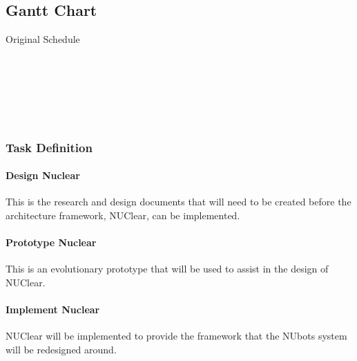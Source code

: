 \documentclass[english,12pt]{scrartcl}
\begin{document}
		\subsection{Gantt Chart}
			Original Schedule
			\begin{figure}[!ht]
				\scalebox{0.8} {
					\begin{ganttchart}[bar/.append style={orange}, link/.append style={thick}]{1}{23}
						 \\
						 \\
						 \\ %
						 \\ %
						 \ganttnewline %
						 \ganttnewline %
						 \ganttnewline %
						 \\ %
						 \ganttnewline %
					\end{ganttchart}
				}
			\end{figure}
			\subsubsection{Task Definition}
				\paragraph{Design Nuclear}
					This is the research and design documents that will need to be created before the architecture framework, NUClear, can be implemented.
				\paragraph{Prototype Nuclear}
					This is an evolutionary prototype that will be used to assist in the design of NUClear.
				\paragraph{Implement Nuclear}
					NUClear will be implemented to provide the framework that the NUbots system will be redesigned around. 
\end{document}
